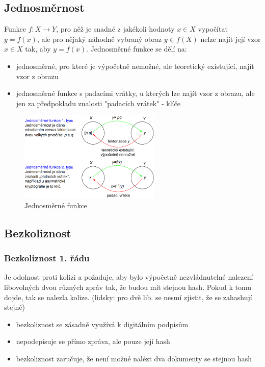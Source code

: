 \documentclass{szzclass}
\begin{document}
\subsection{Jednosměrnost}
Funkce $f: X \rightarrow Y$, pro něž je snadné z jakékoli hodnoty $x \in X$ vypočítat $y = f(x)$, ale pro nějaký náhodně vybraný obraz $y \in f(X)$ nelze
najít její vzor $x \in X$ tak, aby $y = f(x).$
\newline
Jednosměrné funkce se dělí na:
\begin{itemize}
    \item jednosměrné, pro které je výpočetně nemožné, ale teoretický existující, najít vzor z obrazu
    \item jednosměrné funkce s padacími vrátky, u kterých lze najít vzor z obrazu, ale jen za předpokladu znalosti "padacích vrátek" - klíče
\end{itemize}
\begin{figure}[h!]
    \centering
    \includegraphics[width=0.6\textwidth]{topics/bi-spol-06/image/oneWayHashFunction.png}
    \caption{Jednosměrné funkce}
\end{figure}
\subsection{Bezkoliznost}
\subsubsection{Bezkoliznost 1. řádu}
Je odolnost proti kolizi a požaduje, aby bylo výpočetně nezvládnutelné nalezení libovolných dvou různých zpráv tak, že budou mít stejnou hash.
Pokud k tomu dojde, tak se nalezla kolize. (lidsky: pro dvě lib. se nesmí zjistit, že se zahashují stejně)
\begin{itemize}
    \item bezkoliznost se zásadně využívá k digitálním podpisům
    \item nepodepisuje se přímo zpráva, ale pouze její hash
    \item bezkoliznost zaručuje, že není možné nalézt dva dokumenty se stejnou hash
\end{itemize}
\end{document}
